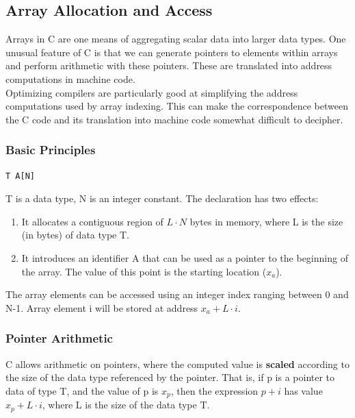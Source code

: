 \documentclass[11pt]{article}
\begin{document}
\subsection{Array Allocation and Access}
\label{sec:org5651264}
Arrays in C are one means of aggregating scalar data into larger data types. One unusual feature of C is that we can generate pointers to elements within arrays and perform arithmetic with these pointers. These are translated into address computations in machine code.\\

Optimizing compilers are particularly good at simplifying the address computations used by array indexing. This can make the correspondence between the C code and its translation into machine code somewhat difficult to decipher.\\

\subsubsection{Basic Principles}
\label{sec:org79265e1}
\begin{verbatim}
T A[N]
\end{verbatim}
T is a data type, N is an integer constant. The declaration has two effects:\\
\begin{enumerate}
\item It allocates a contiguous region of \(L \cdot N\) bytes in memory, where L is the size (in bytes) of data type T.\\
\item It introduces an identifier A that can be used as a pointer to the beginning of the array. The value of this point is the starting location (\(x_a\)).\\
\end{enumerate}
The array elements can be accessed using an integer index ranging between 0 and N-1. Array element i will be stored at address \(x_a + L \cdot i\).\\



\subsubsection{Pointer Arithmetic}
\label{sec:orge8adf91}
C allows arithmetic on pointers, where the computed value is \textbf{scaled} according to the size of the data type referenced by the pointer. That is, if p is a pointer to data of type T, and the value of p is \(x_p\), then the expression \(p+i\) has value \(x_p + L \cdot i\), where L is the size of the data type T.\\
\end{document}
